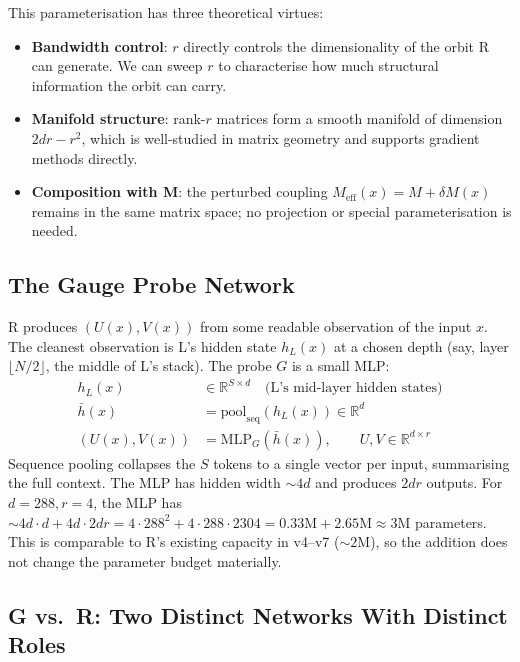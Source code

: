 \documentclass[11pt, a4paper]{article}
\theoremstyle{plain}
\theoremstyle{definition}
\theoremstyle{remark}
\begin{document}
This parameterisation has three theoretical virtues:
\begin{itemize}[nosep]
\item \textbf{Bandwidth control}: $r$ directly controls the dimensionality of the orbit R can generate. We can sweep $r$ to characterise how much structural information the orbit can carry.
\item \textbf{Manifold structure}: rank-$r$ matrices form a smooth manifold of dimension $2dr - r^{2}$, which is well-studied in matrix geometry and supports gradient methods directly.
\item \textbf{Composition with M}: the perturbed coupling $M_{\text{eff}}(x) = M + \delta M(x)$ remains in the same matrix space; no projection or special parameterisation is needed.
\end{itemize}

\subsection{The Gauge Probe Network}

R produces $(U(x), V(x))$ from some readable observation of the input $x$.
The cleanest observation is L's hidden state $h_{L}(x)$ at a chosen depth (say, layer $\lfloor N/2 \rfloor$, the middle of L's stack).
The probe $G$ is a small MLP:
\begin{align}
h_{L}(x) &\in \mathbb{R}^{S \times d} \quad \text{(L's mid-layer hidden states)} \\
\bar{h}(x) &= \mathrm{pool}_{\text{seq}}(h_{L}(x)) \in \mathbb{R}^{d} \\
(U(x), V(x)) &= \mathrm{MLP}_{G}(\bar{h}(x)), \qquad U, V \in \mathbb{R}^{d \times r}
\end{align}
Sequence pooling collapses the $S$ tokens to a single vector per input, summarising the full context.
The MLP has hidden width $\sim 4d$ and produces $2dr$ outputs.
For $d = 288, r = 4$, the MLP has $\sim 4d \cdot d + 4d \cdot 2dr = 4 \cdot 288^{2} + 4 \cdot 288 \cdot 2304 = 0.33\text{M} + 2.65\text{M} \approx 3$M parameters.
This is comparable to R's existing capacity in v4--v7 ($\sim 2$M), so the addition does not change the parameter budget materially.

\subsection{G vs.\ R: Two Distinct Networks With Distinct Roles}
\end{document}
